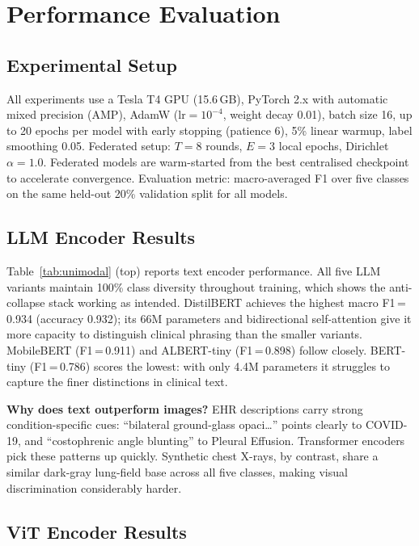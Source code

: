 \documentclass[conference]{IEEEtran}
\begin{document}
\section{Performance Evaluation}

\subsection{Experimental Setup}

All experiments use a Tesla T4 GPU (15.6\,GB), PyTorch 2.x with
automatic mixed precision (AMP), AdamW ($\text{lr}{=}10^{-4}$, weight
decay 0.01), batch size 16, up to 20 epochs per model with early
stopping (patience 6), 5\% linear warmup, label smoothing 0.05.
Federated setup: $T{=}8$ rounds, $E{=}3$ local epochs,
Dirichlet $\alpha{=}1.0$. Federated models are warm-started from the
best centralised checkpoint to accelerate convergence.
Evaluation metric: macro-averaged F1 over five classes on the
same held-out 20\% validation split for all models.

\subsection{LLM Encoder Results}

Table~\ref{tab:unimodal} (top) reports text encoder performance.
All five LLM variants maintain 100\% class diversity throughout
training, which shows the anti-collapse stack working as intended.
DistilBERT achieves the highest macro F1\,=\,0.934 (accuracy 0.932);
its 66M parameters and bidirectional self-attention give it more
capacity to distinguish clinical phrasing than the smaller variants.
MobileBERT (F1\,=\,0.911) and ALBERT-tiny (F1\,=\,0.898) follow
closely. BERT-tiny (F1\,=\,0.786) scores the lowest: with only 4.4M
parameters it struggles to capture the finer distinctions in clinical
text.

\textbf{Why does text outperform images?}
EHR descriptions carry strong condition-specific cues: ``bilateral
ground-glass opaci\ldots'' points clearly to COVID-19, and
``costophrenic angle blunting'' to Pleural Effusion. Transformer
encoders pick these patterns up quickly. Synthetic chest X-rays, by
contrast, share a similar dark-gray lung-field base across all five
classes, making visual discrimination considerably harder.

\subsection{ViT Encoder Results}
\end{document}
